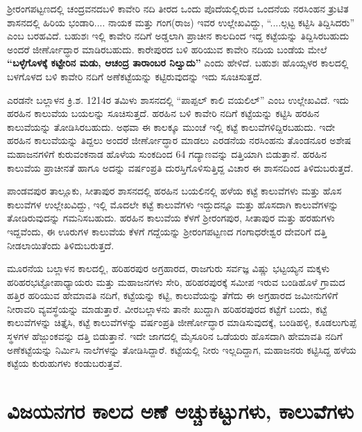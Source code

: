 ಶ‍್ರೀರಂಗಪಟ್ಟಣದಲ್ಲಿ ಚಂದ್ರವನದಬಳಿ ಕಾವೇರಿ ನದಿ ತೀರದ ಒಂದು ಪೊದೆಯಲ್ಲಿರುವ ಒಂದನೆಯ ನರಸಿಂಹನ ತ್ರುಟಿತ ಶಾಸನದಲ್ಲಿ ಹಿರಿಯ ಭಂಡಾರಿ.... ನಾಯಕ ಮತ್ತು ಗಂಗ(ರಾಜ) ಇವರ ಉಲ್ಲೇಖವಿದ್ದು, “....ಲ್ಗಟ್ಟ ಕಟ್ಟಿಸಿ ತಿದ್ದಿಸಿದರು” ಎಂಬ ಬರಹವಿದೆ. ಬಹುಶಃ ಇಲ್ಲಿ ಕಾವೇರಿ ನದಿಗೆ ಅಡ್ಡಲಾಗಿ ಪ್ರಾಚೀನ ಕಾಲದಿಂದ ಇದ್ದ ಕಟ್ಟೆಯನ್ನು ತಿದ್ದಿಸಿರಬಹುದು ಅಂದರೆ ಜೀರ್ಣೋದ್ಧಾರ ಮಾಡಿರಬಹುದು. ಕಾರೇಪುರದ ಬಳಿ ಹರಿಯುವ ಕಾವೇರಿ ನದಿಯ ಬಂಡೆಯ ಮೇಲೆ \textbf{“ಬಳ್ಳೆಗೊಳಕ್ಕೆ ಕಟ್ಟೇರಿನ ಮಡು, ಆಚಂದ್ರ ತಾರಾಂಬರ ನಿಲ್ವುದು”} ಎಂದು ಹೇಳಿದೆ. ಬಹುಶಃ ಹೊಯ್ಸಳರ ಕಾಲದಲ್ಲಿ ಬಳಗೊಳದ ಬಳಿ ಕಾವೇರಿ ನದಿಗೆ ಅಣೆಕಟ್ಟೆಯನ್ನು ಕಟ್ಟಿರುವುದನ್ನು ಇದು ಸೂಚಿಸುತ್ತದೆ.

ಎರಡನೇ ಬಲ್ಲಾಳನ ಕ್ರಿ.ಶ. 1214ರ ತಮಿಳು ಶಾಸನದಲ್ಲಿ “ಪಾಪ್ಪಲ್​ ಕಾಲಿ ವಯಲಿಲ್​” ಎಂಬ ಉಲ್ಲೇಖವಿದೆ. ಇದು ಹರಹಿನ ಕಾಲುವೆಯ ಬಯಲನ್ನು ಸೂಚಿಸುತ್ತದೆ. ಹರಹಿನ ಬಳಿ ಕಾವೇರಿ ನದಿಗೆ ಕಟ್ಟೆಯನ್ನು ಕಟ್ಟಿಸಿ ಹರಹಿನ ಕಾಲುವೆಯನ್ನು ತೋಡಿಸಿರಬಹುದು. ಅಥವಾ ಈ ಕಾಲಕ್ಕೂ ಮುಂಚೆ ಇಲ್ಲಿ ಕಟ್ಟೆ ಕಾಲುವೆಗಳಿದ್ದಿರಬಹುದು. ಇದೇ ಹರಹಿನ ಕಾಲುವೆಯನ್ನು ತಿದ್ದಲು ಅಂದರೆ ಜೀರ್ಣೋದ್ಧಾರ ಮಾಡಲು ಎರಡನೆಯ ನರಸಿಂಹನು ತೊಂಡನೂರ ಅಶೇಷ ಮಹಾಜನಗಳಿಗೆ ಕುರುವಂಕನಾಡ ಹೊಳೆಯ ಸುಂಕದಿಂದ 64 ಗದ್ಯಾಣವನ್ನು ದತ್ತಿಯಾಗಿ ಬಿಡುತ್ತಾನೆ. ಹರಹಿನ ಕಾಲುವೆಯ ಪ್ರಾಚೀನತೆ ಹಾಗೂ ಅದನ್ನು ವರ್ಷಂಪ್ರತಿ ದುರಸ್ತಿಗೊಳಿಸುತ್ತಿದ್ದ ವಿಚಾರ ಈ ಶಾಸನದಿಂದ ತಿಳಿದುಬರುತ್ತದೆ.

ಪಾಂಡವಪುರ ತಾಲ್ಲೂಕು, ಸೀತಾಪುರ ಶಾಸನದಲ್ಲಿ ಹರಹಿನ ಬಯಲಿನಲ್ಲಿ ಹಳೆಯ ಕಟ್ಟೆ ಕಾಲುವೆಗಳು ಮತ್ತು ಹೊಸ ಕಾಲುವೆಗಳ ಉಲ್ಲೇಖವಿದ್ದು, ಇಲ್ಲಿ ಮೊದಲೇ ಕಟ್ಟೆ ಕಾಲುವೆಗಳು ಇದ್ದುದನ್ನೂ ಮತ್ತು ಹೊಸದಾಗಿ ಕಾಲುವೆಗಳನ್ನು ತೋಡಿರುವುದನ್ನು ಗಮನಿಸಬಹುದು. ಹರಹಿನ ಕಾಲುವೆಯ ಕೆಳಗೆ ಶ‍್ರೀರಂಗಪುರ, ಸೀತಾಪುರ ಮತ್ತು ಹರಹುಗಳು ಇದ್ದವೆಂದು, ಈ ಊರುಗಳ ಕಾಲುವೆಯ ಕೆಳಗೆ ಗದ್ದೆಯನ್ನು ಶ‍್ರೀರಂಗಪಟ್ಟಣದ ಗಂಗಾಧರೇಶ್ವರ ದೇವರಿಗೆ ದತ್ತಿ ನೀಡಲಾಯಿತೆಂದು ತಿಳಿದುಬರುತ್ತದೆ.

ಮೂರನೆಯ ಬಲ್ಲಾಳನ ಕಾಲದಲ್ಲಿ, ಹರಿಹರಪುರ ಅಗ್ರಹಾರದ, ರಾಜಗುರು ಸರ್ವಜ್ಞ ವಿಷ್ಣು ಭಟ್ಟಯ್ಯನ ಮಕ್ಕಳು ಹರಿಹರಭಟ್ಟೋಪಾಧ್ಯಾಯರು ಮತ್ತು ಮಹಾಜನಗಳು ಸೇರಿ, ಹರಿಹರಪುರಕ್ಕೆ ಸಮೀಪ ಇರುವ ಬಂಡಿಹೊಳೆ ಗ್ರಾಮದ ಹತ್ತಿರ ಹರಿಯುವ ಹೇಮಾವತಿ ನದಿಗೆ, ಕಟ್ಟೆಯನ್ನು ಕಟ್ಟಿ, ಕಾಲುವೆಯನ್ನು ತೆಗೆದು ಈ ಅಗ್ರಹಾರದ ಜಮೀನುಗಳಿಗೆ ನೀರಾವರಿ ವ್ಯವಸ್ಥೆಯನ್ನು ಮಾಡುತ್ತಾರೆ. ವೀರಬಲ್ಲಾಳನು ತಾನೇ ಖುದ್ದಾಗಿ ಹರಿಹರಪುರದ ಕಟ್ಟೆಗೆ ಬಂದು, ಕಟ್ಟೆ ಕಾಲುವೆಗಳನ್ನು ಚಿತ್ತೈಸಿ, ಕಟ್ಟೆ ಕಾಲುವೆಗಳನ್ನು ವರ್ಷಂಪ್ರತಿ ಜೀರ್ಣೋದ್ಧಾರ ಮಾಡಿಸುವುದಕ್ಕೆ, ಬಂಡಿಹಳ್ಳಿ, ಕೂಡಲುಗುಪ್ಪೆ ಸ್ಥಳಗಳ ಹೆಜ್ಜುಂಕವನ್ನು ದತ್ತಿ ಬಿಡುತ್ತಾನೆ. ಇದೇ ಜಾಗದಲ್ಲಿ ಮೈಸೂರಿನ ಒಡೆಯರು ಹೊಸದಾಗಿ ಹೇಮಾವತಿ ನದಿಗೆ ಅಣೆಕಟ್ಟೆಯನ್ನು ನಿರ್ಮಿಸಿ ನಾಲೆಗಳನ್ನು ತೋಡಿಸಿದ್ದಾರೆ. ಕಟ್ಟೆಯಲ್ಲಿ ನೀರು ಇಲ್ಲದಿದ್ದಾಗ, ಮಹಾಜನರು ಕಟ್ಟಿಸಿದ್ದ ಹಳೆಯ ಕಟ್ಟೆಯ ಕುರುಹುಗಳು ಕಂಡುಬರುತ್ತವೆ.


\section{ವಿಜಯನಗರ ಕಾಲದ ಅಣೆ ಅಚ್ಚುಕಟ್ಟುಗಳು, ಕಾಲುವೆಗಳು}

